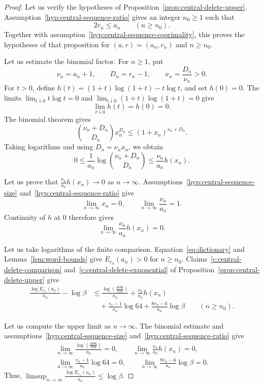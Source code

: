 \begin{proof}
Let us verify the hypotheses of Proposition~\ref{prop:central-delete-upper}.
Assumption~\ref{hyp:central-sequence-ratio} gives an integer $n_0\ge1$ such that
\[
 2r_n\le a_n\qquad(n\ge n_0).
\]
Together with assumption~\ref{hyp:central-sequence-coprimality}, this proves the hypotheses of that proposition for $(a,r)=(a_n,r_n)$ and $n\ge n_0$.

Let us estimate the binomial factor.
For $n\ge1$, put
\[
 \nu_n=a_n+1,\qquad D_n=r_n-1,\qquad x_n=\frac{D_n}{\nu_n}>0.
\]
For $t>0$, define $h(t)=(1+t)\log(1+t)-t\log t$, and set $h(0)=0$.
The limits $\lim_{t\downarrow0}t\log t=0$ and
$\lim_{t\downarrow0}(1+t)\log(1+t)=0$ give
\[
 \lim_{t\downarrow0}h(t)=h(0)=0.
\]
The binomial theorem gives
\[
 \binom{\nu_n+D_n}{D_n}x_n^{D_n}
 \le(1+x_n)^{\nu_n+D_n}.
\]
Taking logarithms and using $D_n=\nu_n x_n$, we obtain
\[
 0\le\frac1{a_n}\log\binom{\nu_n+D_n}{D_n}
 \le\frac{\nu_n}{a_n}h(x_n).
\]

Let us prove that $\frac{\nu_n}{a_n}h(x_n)\to0$ as $n\to\infty$.
Assumptions~\ref{hyp:central-sequence-size} and~\ref{hyp:central-sequence-ratio} give
\[
 \lim_{n\to\infty}x_n=0,\qquad
 \lim_{n\to\infty}\frac{\nu_n}{a_n}=1.
\]
Continuity of $h$ at $0$ therefore gives
\[
 \lim_{n\to\infty}\frac{\nu_n}{a_n}h(x_n)=0.
\]

Let us take logarithms of the finite comparison.
Equation~\eqref{eq:dictionary} and Lemma~\ref{lem:word-bounds} give
$E_{r_n}(a_n)>0$ for $n\ge n_0$.
Claims~\ref{c:central-delete-comparison} and~\ref{c:central-delete-exponential} of
Proposition~\ref{prop:central-delete-upper} give
\[
 \begin{aligned}
 \frac{\log E_{r_n}(a_n)}{a_n}-\log\beta
 &\le\frac{\log\left(\frac{4096}{729}\right)}{a_n}
       +\frac{\nu_n}{a_n}h(x_n)\\
 &\quad+\frac{r_n-1}{a_n}\log64
       +\frac{8r_n-6}{a_n}\log\beta
       \qquad(n\ge n_0).
 \end{aligned}
\]

Let us compute the upper limit as $n\to\infty$.
The binomial estimate and assumptions~\ref{hyp:central-sequence-size}
and~\ref{hyp:central-sequence-ratio} give
\[
 \begin{gathered}
 \lim_{n\to\infty}\frac{\log\left(\frac{4096}{729}\right)}{a_n}=0,
 \qquad \lim_{n\to\infty}\frac{\nu_n}{a_n}h(x_n)=0,\\
 \lim_{n\to\infty}\frac{r_n-1}{a_n}\log64=0,
 \qquad \lim_{n\to\infty}\frac{8r_n-6}{a_n}\log\beta=0.
 \end{gathered}
\]
Thus, $\displaystyle\limsup_{n\to\infty}\frac{\log E_{r_n}(a_n)}{a_n}\le\log\beta$.
\end{proof}


